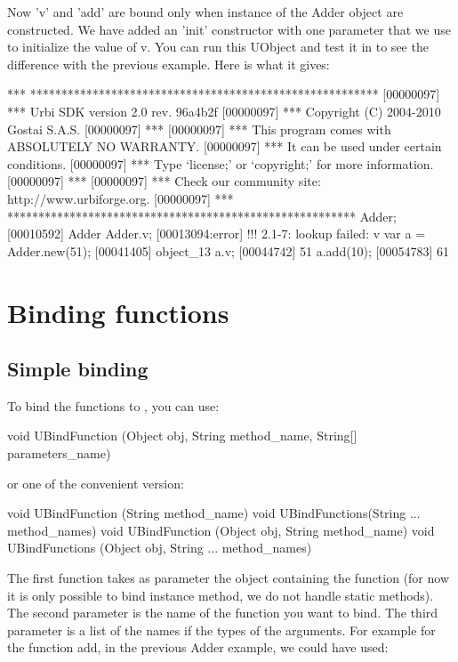 Now 'v' and 'add' are bound only when instance of the Adder object are
constructed. We have added an 'init' constructor with one parameter that
we use to initialize the value of v. You can run this UObject and test
it in \urbi to see the difference with the previous example. Here is what
it gives:

\begin{urbiunchecked}
[00000097] *** ********************************************************
[00000097] *** Urbi SDK version 2.0 rev. 96a4b2f
[00000097] *** Copyright (C) 2004-2010 Gostai S.A.S.
[00000097] ***
[00000097] *** This program comes with ABSOLUTELY NO WARRANTY.
[00000097] *** It can be used under certain conditions.
[00000097] *** Type `license;' or `copyright;' for more information.
[00000097] ***
[00000097] *** Check our community site: http://www.urbiforge.org.
[00000097] *** ********************************************************
Adder;
[00010592] Adder
Adder.v;
[00013094:error] !!! 2.1-7: lookup failed: v
var a = Adder.new(51);
[00041405] object_13
a.v;
[00044742] 51
a.add(10);
[00054783] 61
\end{urbiunchecked}


\section{Binding functions}
\label{sec:uob:apijava:func}

\subsection{Simple binding}

To bind the functions to \urbi, you can use:
\begin{java}
void UBindFunction (Object obj, String method_name, String[] parameters_name)
\end{java}
or one of the convenient version:
\begin{java}
void UBindFunction (String method_name)
void UBindFunctions(String ... method_names)
void UBindFunction (Object obj, String method_name)
void UBindFunctions (Object obj, String ... method_names)
\end{java}

The first function takes as parameter the object containing the function
(for now it is only possible to bind instance method, we do not handle static
methods). The second parameter is the name of the function you want to bind.
The third parameter is a list of the names if the types of the arguments.
For example for the function add, in the previous Adder example, we could have
used:

